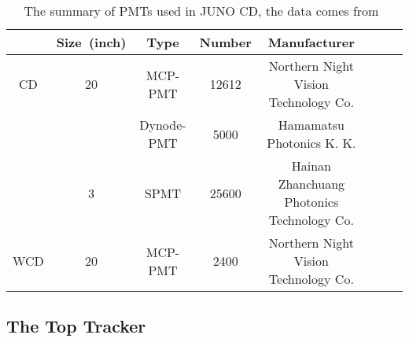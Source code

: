 \begin{table}[htbp]
	\centering %
	\caption{The summary of PMTs used in JUNO CD, the data comes from~\cite{muon207,PMT-3inch,JUNO:2022hlz}}
	\label{tab:juno_pmt}
	\begin{tabular}{cccccccc}
		\toprule %
		    & Size~(\si{inch}) & Type       & Number & Manufacturer                               \\
		\midrule %
		CD  & 20               & MCP-PMT    & 12612  & Northern Night Vision Technology Co.       \\
		    &                  & Dynode-PMT & 5000   & Hamamatsu Photonics K. K.                  \\
		    & 3                & SPMT       & 25600  & Hainan Zhanchuang Photonics Technology Co. \\
		WCD & 20               & MCP-PMT    & 2400   & Northern Night Vision Technology Co.       \\
		\bottomrule %
	\end{tabular}
\end{table}

\subsection{The Top Tracker}
